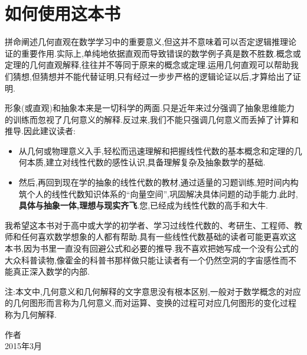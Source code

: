\documentclass[12pt]{article}
\renewcommand{\,}{\ \text{,}}
\renewcommand{\.}{\ \text{.}}
\begin{document}
\section{如何使用这本书}

拼命阐述几何直观在数学学习中的重要意义,但这并不意味着可以否定逻辑推理论证的重要作用.实际上,单纯地依据直观而导致错误的数学例子真是数不胜数.概念或定理的几何直观解释,往往并不等同于原来的概念或定理.运用几何直观可以帮助我们猜想,但猜想并不能代替证明,只有经过一步步严格的逻辑论证以后,才算给出了证明.

形象(或直观)和抽象本来是一切科学的两面.只是近年来过分强调了抽象思维能力的训练而忽视了几何意义的解释.反过来,我们不能只强调几何意义而丢掉了计算和推导.因此建议读者:

\begin{itemize}
\item
  从几何或物理意义入手,轻松而迅速理解和把握线性代数的基本概念和定理的几何本质,建立对线性代数的感性认识,具备理解复杂及抽象数学的基础.
\item
  然后,再回到现在学的抽象的线性代数的教材,通过适量的习题训练,短时间内构筑个人的线性代数知识体系的``向量空间'',巩固解决具体问题的动手能力.此时,\textbf{具体与抽象一体,理想与现实齐飞}.您,已经成为线性代数的高手和大牛.
\end{itemize}

我希望这本书对于高中或大学的初学者、学习过线性代数的、考研生、工程师、教师和任何喜欢数学想象的人都有帮助.具有一些线性代数基础的读者可能更喜欢这本书,因为书里一直没有回避公式和必要的推导.我不喜欢把她写成一个没有公式的大众科普读物,像霍金的科普书那样做只能让读者有一个仍然空洞的字宙感性而不能真正深入数学的内部.

注:本文中,几何意义和几何解释的文字意思没有根本区别,一般对于数学概念的对应的几何图形而言称为几何意义,而对运算、变换的过程可对应几何图形的变化过程称为几何解释.

\begin{flushright}
    \begin{minipage}[c][5cm][c]{3cm}
        \centering
        作者\\
        2015年3月
    \end{minipage}
\end{flushright}
\end{document}
